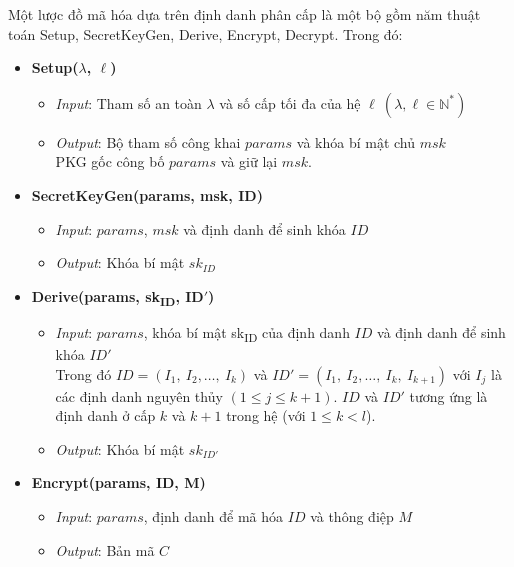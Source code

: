 \documentclass[class=report, crop=false]{standalone}
\begin{document}
		\begin{definition}[HIBE]
			Một lược đồ mã hóa dựa trên định danh phân cấp là một bộ gồm năm thuật toán \textsf{Setup, SecretKeyGen, Derive, Encrypt, Decrypt}. Trong đó:
			\vspace{-0.5cm}
			\begin{itemize}
				\item[] {\sffamily\bfseries Setup($\lambda$, $\ell$)}
				\begin{itemize}
					\item[\textbullet] \textit{Input}: Tham số an toàn $\lambda$ và số cấp tối đa của hệ $\ell \ (\lambda, \ell \in \mathbb{N^*})$
					\item[\textbullet] \textit{Output}: Bộ tham số công khai $params$ và khóa bí mật chủ $msk$ \\
					PKG gốc công bố $params$ và giữ lại $msk$.
				\end{itemize}
				\item[] {\sffamily\bfseries SecretKeyGen(params, msk, ID)}
				\begin{itemize}
					\item[\textbullet] \textit{Input}: $params$, $msk$ và định danh để sinh khóa $ID$
					\item[\textbullet] \textit{Output}: Khóa bí mật $sk_{ID}$
				\end{itemize}
				\item[] {\sffamily\bfseries Derive(params, sk\textsubscript{ID}, ID$'$)}
				\begin{itemize}
					\item[\textbullet] \textit{Input}: $params$, khóa bí mật sk\textsubscript{ID} của định danh $ID$ và định danh để sinh khóa $ID'$ \\
					Trong đó $ID = (I_1,\ I_2, \dots,\ I_k)$ và $ID' = (I_1,\ I_2, \dots,\ I_k,\ I_{k + 1})$ với $I_j$ là các định danh nguyên thủy $(1 \leq j \leq k + 1)$. $ID$ và $ID'$ tương ứng là định danh ở cấp $k$ và $k + 1$ trong hệ (với $1 \leq k < l$).
					\item[\textbullet] \textit{Output}: Khóa bí mật $sk_{ID'}$
				\end{itemize}
				\item[] {\sffamily\bfseries Encrypt(params, ID, M)}
				\begin{itemize}
					\item[\textbullet] \textit{Input}: $params$, định danh để mã hóa $ID$ và thông điệp $M$
					\item[\textbullet] \textit{Output}: Bản mã $C$
				\end{itemize}

\end{itemize}
\end{definition}
\end{document}
